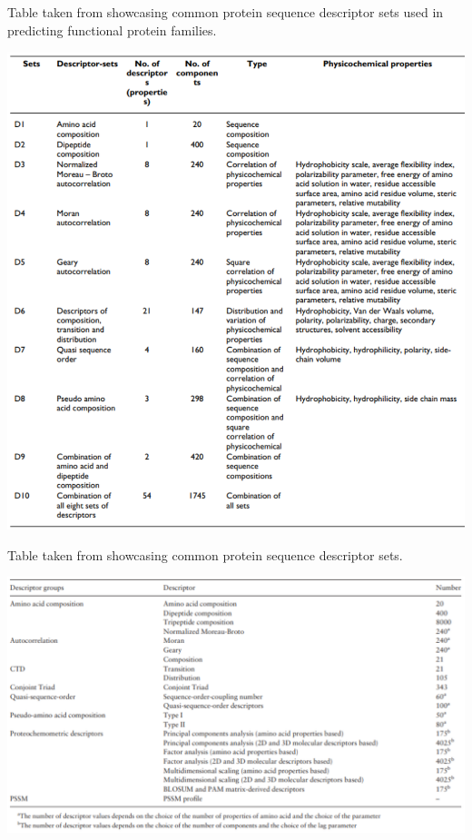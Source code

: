 \begin{table}[!ht]
  \caption{Table taken from \citet{Ong2007} showcasing common protein sequence descriptor sets used in predicting functional protein families.}
  \label{tbl:Protein_Sequence_Descriptors}
  \includegraphics[width=1.0\linewidth]{images/Protein_Sequence_Descriptors.pdf}
\end{table}

\begin{table}[!ht]
  \caption{Table taken from \citet{ProtR_Paper} showcasing common protein sequence descriptor sets.}
  \label{tbl:Protr_Descriptors}
  \includegraphics[width=1.0\linewidth]{images/Protr_Descriptors.pdf}
\end{table}

